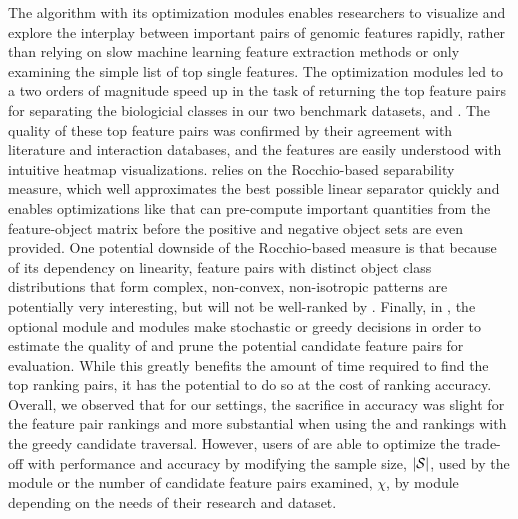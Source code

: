 The \genviz algorithm with its optimization modules enables researchers to
visualize and explore the interplay between important pairs of genomic features
rapidly, rather than relying on slow machine learning feature extraction methods
or only examining the simple list of top single features.  The optimization
modules led to a two orders of magnitude speed up in the task of returning the
top feature pairs for separating the biologicial classes in our two
benchmark datasets, \msig and \lincs. The quality of these top feature pairs
was confirmed by their agreement with literature and interaction databases,
and the features are easily understood with intuitive heatmap visualizations.
\genviz relies on the Rocchio-based separability measure, which well
approximates the best possible linear separator quickly and enables
optimizations like \trans that can pre-compute important quantities from the
feature-object matrix before the positive and negative object sets are even
provided. One potential downside of the Rocchio-based measure is
that because of its dependency on linearity, feature pairs with distinct
object class distributions that form complex, non-convex, non-isotropic
patterns are potentially very interesting, but will not be well-ranked by
\genviz. Finally, in \genviz, the optional \sampling module and \traversal
modules make stochastic or greedy decisions in order to estimate the quality of
and prune the potential candidate feature pairs for evaluation.  While this
greatly benefits the amount of time required to find the top ranking pairs, it
has the potential to do so at the cost of ranking accuracy. Overall, we observed
that for our settings, the sacrifice in accuracy was slight for the \sampOpt
feature pair rankings and more substantial when using the \horiz and \vertic
rankings with the greedy candidate traversal.  However, users of \genviz are
able to optimize the trade-off with performance and accuracy by modifying the
sample size, $|{\mathcal{S}}|$, used by the \sampling module or the number of candidate
feature pairs examined, $\chi$, by \traversal module depending on the needs of
their research and dataset.



